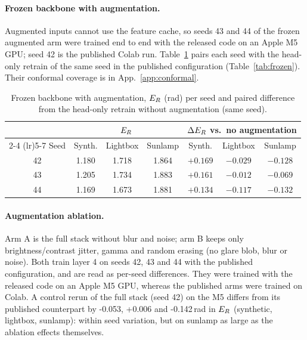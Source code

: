 \paragraph{Frozen backbone with augmentation.} Augmented inputs cannot use the feature
cache, so seeds 43 and 44 of the frozen augmented arm were trained end to end with the
released code on an Apple M5 GPU; seed 42 is the published Colab run.
Table~\ref{tab:frozenaug} pairs each seed with the head-only retrain of the same seed in
the published configuration (Table~\ref{tab:frozen}). Their conformal coverage is in
App.~\ref{app:conformal}.

\begin{table}[ht]
  \setlength{\tabcolsep}{3pt}
  \caption{Frozen backbone with augmentation, $E_{R}$ (rad) per seed and paired difference
  from the head-only retrain without augmentation (same seed).}
  \label{tab:frozenaug}
  \centering
  \small
  \begin{tabular}{c ccc ccc}
    \toprule
    & \multicolumn{3}{c}{$E_{R}$} & \multicolumn{3}{c}{$\Delta E_{R}$ vs.\ no augmentation} \\
    \cmidrule(lr){2-4} \cmidrule(lr){5-7}
    Seed & Synth. & Lightbox & Sunlamp & Synth. & Lightbox & Sunlamp \\
    \midrule
    42 & 1.180 & 1.718 & 1.864 & $+0.169$ & $-0.029$ & $-0.128$ \\
    43 & 1.205 & 1.734 & 1.883 & $+0.161$ & $-0.012$ & $-0.069$ \\
    44 & 1.169 & 1.673 & 1.881 & $+0.134$ & $-0.117$ & $-0.132$ \\
    \bottomrule
  \end{tabular}
\end{table}

\paragraph{Augmentation ablation.} Arm A is the full stack without blur and noise;
arm B keeps only brightness/contrast jitter, gamma and random erasing (no glare blob,
blur or noise). Both train layer 4 on seeds 42, 43 and 44 with the published
configuration, and are read as per-seed differences. They were trained with the
released code on an Apple M5 GPU, whereas the published arms were trained on Colab.
A control rerun of the full stack (seed 42) on the M5 differs from its published
counterpart by -0.053, +0.006 and -0.142\,rad in $E_{R}$
(synthetic, lightbox, sunlamp): within seed variation, but on sunlamp as large as the
ablation effects themselves.

